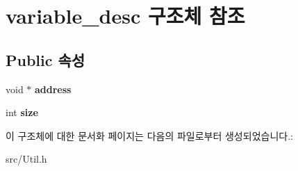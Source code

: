 \hypertarget{structvariable__desc}{}\section{variable\+\_\+desc 구조체 참조}
\label{structvariable__desc}
\subsection*{Public 속성}
\begin{DoxyCompactItemize}
\item 
\mbox{\label{structvariable__desc_a8c9e09fce894d5f90f88b51a39a8d951}} 
void $\ast$ {\bfseries address}
\item 
\mbox{\label{structvariable__desc_a4ba82f17bb7b2231d8884eebde322bca}} 
int {\bfseries size}
\end{DoxyCompactItemize}


이 구조체에 대한 문서화 페이지는 다음의 파일로부터 생성되었습니다.\+:\begin{DoxyCompactItemize}
\item 
src/Util.\+h\end{DoxyCompactItemize}
